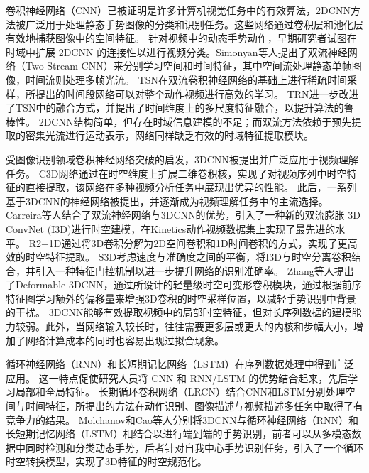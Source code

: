卷积神经网络（CNN）已被证明是许多计算机视觉任务中的有效算法，2DCNN方法被广泛用于处理静态手势图像的分类和识别任务。这些网络通过卷积层和池化层有效地捕获图像中的空间特征。
针对视频中的动态手势动作，早期研究者试图在时域中扩展 2DCNN 的连接性以进行视频分类\cite{karpathy2014large}。Simonyan等人\cite{simonyan2014twostream}提出了双流神经网络（Two Stream CNN）来分别学习空间和时间特征，其中空间流处理静态单帧图像，时间流则处理多帧光流。
TSN\cite{wang2016tsn}在双流卷积神经网络的基础上进行稀疏时间采样，所提出的时间段网络可以对整个动作视频进行高效的学习。
TRN\cite{zhou2018trn}进一步改进了TSN中的融合方式，并提出了时间维度上的多尺度特征融合，以提升算法的鲁棒性。
2DCNN结构简单，但存在时域信息建模的不足；而双流方法依赖于预先提取的密集光流进行运动表示，网络同样缺乏有效的时域特征提取模块。

受图像识别领域卷积神经网络突破的启发，3DCNN被提出并广泛应用于视频理解任务。
C3D网络\cite{tran2015c3d}通过在时空维度上扩展二维卷积核，实现了对视频序列中时空特征的直接提取，该网络在多种视频分析任务中展现出优异的性能。
此后，一系列基于3DCNN的神经网络被提出，并逐渐成为视频理解任务中的主流选择。
Carreira等人\cite{carreira2017i3d}结合了双流神经网络与3DCNN的优势，引入了一种新的双流膨胀 3D ConvNet (I3D)进行时空建模，在Kinetics动作视频数据集上实现了最先进的水平。
R2+1D\cite{tran2018r2+1d}通过将3D卷积分解为2D空间卷积和1D时间卷积的方式，实现了更高效的时空特征提取。
S3D\cite{xie2018s3d}考虑速度与准确度之间的平衡，将I3D与时空分离卷积结合，并引入一种特征门控机制以进一步提升网络的识别准确率。
Zhang等人提出了Deformable 3DCNN\cite{zhang2020deformable3d}，通过所设计的轻量级时空可变形卷积模块，通过根据前序特征图学习额外的偏移量来增强3D卷积的时空采样位置，以减轻手势识别中背景的干扰。
3DCNN能够有效提取视频中的局部时空特征，但对长序列数据的建模能力较弱。此外，当网络输入较长时，往往需要更多层或更大的内核和步幅大小，增加了网络计算成本的同时也容易出现过拟合现象。

循环神经网络（RNN）\cite{jozefowicz2015empirical}和长短期记忆网络（LSTM）\cite{yue2015beyond}在序列数据处理中得到广泛应用。
这一特点促使研究人员将 CNN 和 RNN/LSTM 的优势结合起来，先后学习局部和全局特征。
长期循环卷积网络（LRCN）\cite{donahue2015lrcn}结合CNN和LSTM分别处理空间与时间特征，所提出的方法在动作识别、图像描述与视频描述多任务中取得了有竞争力的结果。
Molchanov\cite{molchanov2016online}和Cao\cite{cao2017egocentric}等人分别将3DCNN与循环神经网络（RNN）和长短期记忆网络（LSTM）相结合以进行端到端的手势识别，前者可以从多模态数据中同时检测和分类动态手势，后者针对自我中心手势识别任务，引入了一个循环时空转换模型，实现了3D特征的时空规范化。

